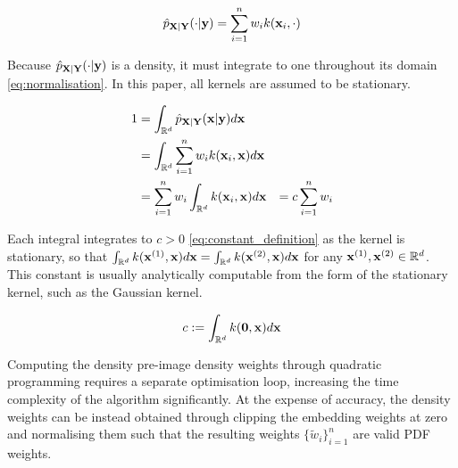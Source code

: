 \documentclass[twoside]{article} \usepackage{aistats2017}
\theoremstyle{definition}
\theoremstyle{theorem}
\begin{document}
		\begin{equation}
			\hat{p}_{\mathbf{X} | \mathbf{Y}}(\cdot | \mathbf{y}) = \sum_{i = 1}^{n} w_{i} k(\mathbf{x}_{i}, \cdot)
		\label{eq:general_conditional_density}
		\end{equation}
		
		Because $\hat{p}_{\mathbf{X} | \mathbf{Y}}(\cdot | \mathbf{y})$ is a density, it must integrate to one throughout its domain \eqref{eq:normalisation}. In this paper, all kernels are assumed to be stationary.
		
		\begin{equation}
			\begin{aligned}
				1 &= \int_{\mathbb{R}^{d}} \hat{p}_{\mathbf{X} | \mathbf{Y}}(\mathbf{x} | \mathbf{y}) d\mathbf{x} \\
				&= \int_{\mathbb{R}^{d}} \sum_{i = 1}^{n} w_{i} k(\mathbf{x}_{i}, \mathbf{x}) d\mathbf{x} \\
				&= \sum_{i = 1}^{n} w_{i} \int_{\mathbb{R}^{d}} k(\mathbf{x}_{i}, \mathbf{x}) d\mathbf{x}
				&= c \sum_{i = 1}^{n} w_{i}
			\end{aligned}
		\label{eq:normalisation}
		\end{equation}
				
		Each integral integrates to $c > 0$ \eqref{eq:constant_definition} as the kernel is stationary, so that $\int_{\mathbb{R}^{d}} k(\mathbf{x}^{(1)}, \mathbf{x}) d\mathbf{x} = \int_{\mathbb{R}^{d}} k(\mathbf{x}^{(2)}, \mathbf{x}) d\mathbf{x}$ for any $\mathbf{x}^{(1)}, \mathbf{x}^{(2)} \in \mathbb{R}^{d}$. This constant is usually analytically computable from the form of the stationary kernel, such as the Gaussian kernel.
		
		\begin{equation}
			c := \int_{\mathbb{R}^{d}} k(\mathbf{0}, \mathbf{x}) d\mathbf{x}
		\label{eq:constant_definition}
		\end{equation}

		Computing the density pre-image density weights through quadratic programming requires a separate optimisation loop, increasing the time complexity of the algorithm significantly. At the expense of accuracy, the density weights can be instead obtained through clipping the embedding weights at zero and normalising them such that the resulting weights $\{\tilde{w}_{i}\}_{i = 1}^{n}$ are valid PDF weights.
\end{document}
